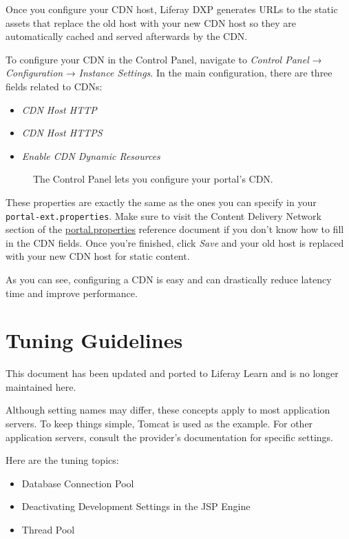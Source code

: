 Once you configure your CDN host, Liferay DXP generates URLs to the
static assets that replace the old host with your new CDN host so they
are automatically cached and served afterwards by the CDN.

To configure your CDN in the Control Panel, navigate to \emph{Control
Panel} → \emph{Configuration} → \emph{Instance Settings}. In the main
configuration, there are three fields related to CDNs:

\begin{itemize}
\tightlist
\item
  \emph{CDN Host HTTP}
\item
  \emph{CDN Host HTTPS}
\item
  \emph{Enable CDN Dynamic Resources}
\end{itemize}

\begin{figure}
\centering
{}
\caption{The Control Panel lets you configure your portal's CDN.}
\end{figure}

These properties are exactly the same as the ones you can specify in
your \texttt{portal-ext.properties}. Make sure to visit the Content
Delivery Network section of the
\href{@platform-ref@/7.2-latest/propertiesdoc/portal.properties.html\#Content\%20Delivery\%20Network}{portal.properties}
reference document if you don't know how to fill in the CDN fields. Once
you're finished, click \emph{Save} and your old host is replaced with
your new CDN host for static content.

As you can see, configuring a CDN is easy and can drastically reduce
latency time and improve performance.

\chapter{Tuning Guidelines}\label{tuning-guidelines}

{This document has been updated and ported to Liferay Learn and is no
longer maintained here.}

Although setting names may differ, these concepts apply to most
application servers. To keep things simple, Tomcat is used as the
example. For other application servers, consult the provider's
documentation for specific settings.

Here are the tuning topics:

\begin{itemize}
\tightlist
\item
  Database Connection Pool
\item
  Deactivating Development Settings in the JSP Engine
\item
  Thread Pool
\end{itemize}

